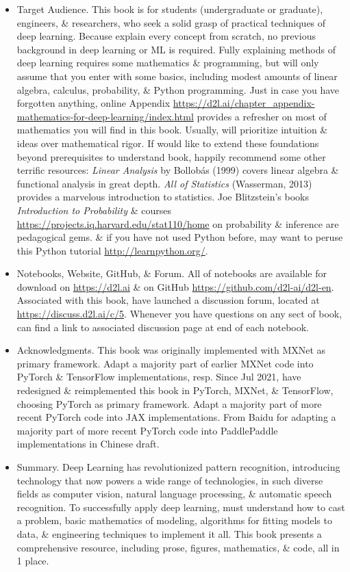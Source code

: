 \documentclass{article}
\begin{document}
\begin{itemize}
\begin{itemize}
\begin{itemize}
			\item {\sf Target Audience.} This book is for students (undergraduate or graduate), engineers, \& researchers, who seek a solid grasp of practical techniques of deep learning. Because explain every concept from scratch, no previous background in deep learning or ML is required. Fully explaining methods of deep learning requires some mathematics \& programming, but will only assume that you enter with some basics, including modest amounts of linear algebra, calculus, probability, \& Python programming. Just in case you have forgotten anything, online Appendix \url{https://d2l.ai/chapter_appendix-mathematics-for-deep-learning/index.html} provides a refresher on most of mathematics you will find in this book. Usually, will prioritize intuition \& ideas over mathematical rigor. If would like to extend these foundations beyond prerequisites to understand book, happily recommend some other terrific resources: {\it Linear Analysis} by {\sc Bollob\'as} (1999) covers linear algebra \& functional analysis in great depth. {\it All of Statistics} (Wasserman, 2013) provides a marvelous introduction to statistics. {\sc Joe Blitzstein}'s books {\it Introduction to Probability} \& courses \url{https://projects.iq.harvard.edu/stat110/home} on probability \& inference are pedagogical gems. \& if you have not used Python before, may want to peruse this Python tutorial \url{http://learnpython.org/}.
			\item {\sf Notebooks, Website, GitHub, \& Forum.} All of notebooks are available for download on \url{https://d2l.ai} \& on GitHub \url{https://github.com/d2l-ai/d2l-en}. Associated with this book, have launched a discussion forum, located at \url{https://discuss.d2l.ai/c/5}. Whenever you have questions on any sect of book, can find a link to associated discussion page at end of each notebook.
			\item {\sf Acknowledgments.} This book was originally implemented with MXNet as primary framework. Adapt a majority part of earlier MXNet code into PyTorch \& TensorFlow implementations, resp. Since Jul 2021, have redesigned \& reimplemented this book in PyTorch, MXNet, \& TensorFlow, choosing PyTorch as primary framework. Adapt a majority part of more recent PyTorch code into JAX implementations. From Baidu for adapting a majority part of more recent PyTorch code into PaddlePaddle implementations in Chinese draft.
			\item {\sf Summary.} Deep Learning has revolutionized pattern recognition, introducing technology that now powers a wide range of technologies, in such diverse fields as computer vision, natural language processing, \& automatic speech recognition. To successfully apply deep learning, must understand how to cast a problem, basic mathematics of modeling, algorithms for fitting models to data, \& engineering techniques to implement it all. This book presents a comprehensive resource, including prose, figures, mathematics, \& code, all in 1 place.

\end{itemize}
\end{itemize}
\end{itemize}
\end{document}
